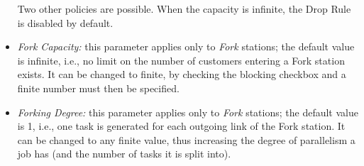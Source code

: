 \begin{itemize}
Two other policies are possible. When the capacity is infinite,
the Drop Rule is disabled by default. \item \emph{Fork Capacity:}
this parameter applies only to \emph{Fork} stations; the default
value is infinite, i.e., no limit on the number of customers
entering a Fork station exists. It can be changed to finite, by
checking the blocking checkbox and a finite number must then be
specified. \item \emph{Forking Degree:} this parameter applies
only to \emph{Fork} stations; the default value is 1, i.e., one
task is generated for each outgoing link of the Fork station. It
can be changed to any finite value, thus increasing the degree of
parallelism a job has
(and the number of tasks it is split into).\\
\end{itemize}

